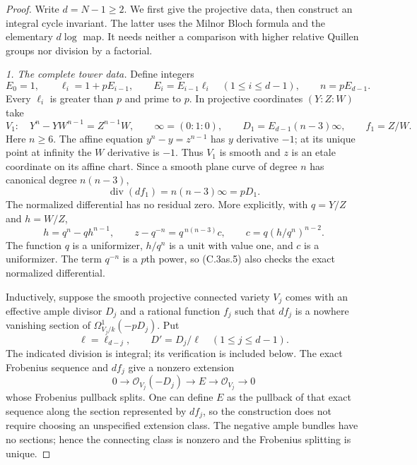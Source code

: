 \begin{proof}
Write $d=N-1\ge2$. We first give the projective data, then construct an
integral cycle invariant. The latter uses the Milnor Bloch formula and
the elementary $d\log$ map. It needs neither a comparison with higher
relative Quillen groups nor division by a factorial.

\emph{1. The complete tower data.}
Define integers
\[
 E_0=1,\qquad \ell_i=1+pE_{i-1},\qquad E_i=E_{i-1}\ell_i
               \quad(1\le i\le d-1),\qquad n=pE_{d-1}.
 \tag{C.3as.2}
\]
Every $\ell_i$ is greater than $p$ and prime to $p$.
In projective coordinates $(Y:Z:W)$ take
\[
 V_1:\quad Y^n-YW^{n-1}=Z^{n-1}W,\qquad
 \infty=(0:1:0),\qquad
 D_1=E_{d-1}(n-3)\infty,\qquad f_1=Z/W .
 \tag{C.3as.3}
\]
Here $n\ge6$. The affine equation $y^n-y=z^{n-1}$ has
$y$ derivative $-1$; at its unique point at infinity the $W$
derivative is $-1$. Thus $V_1$ is smooth and $z$ is an etale
coordinate on its affine chart. Since a smooth plane curve of
degree $n$ has canonical degree $n(n-3)$,
\[
                  \operatorname{div}(df_1)=n(n-3)\infty=pD_1.
 \tag{C.3as.4}
\]
The normalized differential has no residual zero. More explicitly,
with $q=Y/Z$ and $h=W/Z$,
\[
 h=q^n-qh^{n-1},\qquad
 z-q^{-n}=q^{\,n(n-3)}c,\qquad
 c=q(h/q^n)^{n-2}.
 \tag{C.3as.5}
\]
The function $q$ is a uniformizer, $h/q^n$ is a unit with value
one, and $c$ is a uniformizer. The term $q^{-n}$ is a $p$th
power, so (C.3as.5) also checks the exact normalized differential.

Inductively, suppose the smooth projective connected variety $V_j$
comes with an effective ample divisor $D_j$ and a rational function
$f_j$ such that $df_j$ is a nowhere vanishing section of
$\Omega^1_{V_j/k}(-pD_j)$. Put
\[
          \ell=\ell_{d-j},\qquad D'=D_j/\ell
                         \quad(1\le j\le d-1).
 \tag{C.3as.6}
\]
The indicated division is integral; its verification is included below.
The exact Frobenius sequence and $df_j$ give a nonzero extension
\[
 0\longrightarrow\mathcal O_{V_j}(-D_j)
   \longrightarrow E\longrightarrow\mathcal O_{V_j}
   \longrightarrow0
 \tag{C.3as.7}
\]
whose Frobenius pullback splits. One can define $E$ as the pullback
of that exact sequence along the section represented by $df_j$,
so the construction does not require choosing an unspecified
extension class. The negative ample bundles have no sections;
hence the connecting class is nonzero and the Frobenius splitting
is unique.


\end{proof}
